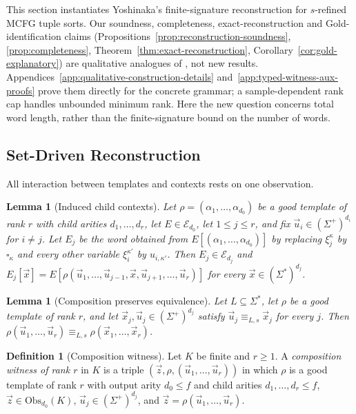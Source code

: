 \documentclass[11pt]{article}
\numberwithin{equation}{section}
\theoremstyle{plain}
\newtheorem{lemma}[theorem]{Lemma}
\theoremstyle{definition}
\newtheorem{definition}[theorem]{Definition}
\theoremstyle{remark}
\newcommand{\tuple}[1]{\vec{#1}}
\newcommand{\blank}{\square}
\theoremstyle{plain}
\begin{document}
This section instantiates Yoshinaka's finite-signature reconstruction
\cite{Yoshinaka2015General} for $s$-refined MCFG tuple sorts.
Our soundness, completeness, exact-reconstruction and Gold-identification
claims (Propositions~\ref{prop:reconstruction-soundness},
\ref{prop:completeness}, Theorem~\ref{thm:exact-reconstruction},
Corollary~\ref{cor:gold-explanatory}) are qualitative analogues of
\cite[Lemmas~2--3 and Theorem~1]{Yoshinaka2015General},
not new results.  Appendices~\ref{app:qualitative-construction-details}
and~\ref{app:typed-witness-aux-proofs} prove them directly for the
concrete grammar; a sample-dependent rank cap handles unbounded
minimum rank.  Here the new question concerns total word length,
rather than the finite-signature bound on the number of words.

\subsection{Set-Driven Reconstruction}

All interaction between templates and contexts rests on one observation.

\begin{lemma}[Induced child contexts]
\label{lem:filling-identity}
Let $\rho=(\alpha_1,\ldots,\alpha_{d_0})$ be a good template of rank $r$ with child
arities $d_1,\ldots,d_r$, let $E\in\mathcal E_{d_0}$, let $1\le j\le r$, and fix
$\tuple u_i\in(\Sigma^+)^{d_i}$ for $i\ne j$.  Let $E_j$ be the word obtained
from $E[(\alpha_1,\ldots,\alpha_{d_0})]$ by replacing $\xi_j^\kappa$ by
$\blank_\kappa$ and every other variable $\xi_i^{\kappa'}$ by $u_{i,\kappa'}$.  Then
$E_j\in\mathcal E_{d_j}$ and
$E_j[\tuple x]=E[\rho(\tuple u_1,\ldots,\tuple u_{j-1},\tuple x,
\tuple u_{j+1},\ldots,\tuple u_r)]$ for every
$\tuple x\in(\Sigma^*)^{d_j}$.
\end{lemma}

\begin{lemma}[Composition preserves equivalence]
\label{lem:witnessed-composition}
Let $L\subseteq\Sigma^*$, let $\rho$ be a good template of rank $r$, and let
$\tuple x_j,\tuple u_j\in(\Sigma^+)^{d_j}$ satisfy
$\tuple u_j\equiv_{L,s}\tuple x_j$ for every $j$.  Then
$\rho(\tuple u_1,\ldots,\tuple u_r)\equiv_{L,s}\rho(\tuple x_1,\ldots,\tuple x_r)$.
\end{lemma}

\begin{definition}[Composition witness]
\label{def:composition-witness}
Let $K$ be finite and $r\ge1$.  A \emph{composition witness of rank $r$} in $K$
is a triple $(\tuple z,\rho,(\tuple u_1,\ldots,\tuple u_r))$ in which $\rho$
is a good template of rank $r$ with output arity $d_0\le f$ and child arities
$d_1,\ldots,d_r\le f$, $\tuple z\in\mathrm{Obs}_{d_0}(K)$,
$\tuple u_j\in(\Sigma^+)^{d_j}$, and
$\tuple z=\rho(\tuple u_1,\ldots,\tuple u_r)$.
\end{definition}
\end{document}
